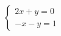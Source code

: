 $\displaystyle
\left\{
\begin{array}{l}
\displaystyle 2x + y = 0 \\
\displaystyle - x - y = 1
\end{array}
\right.
$
% 
